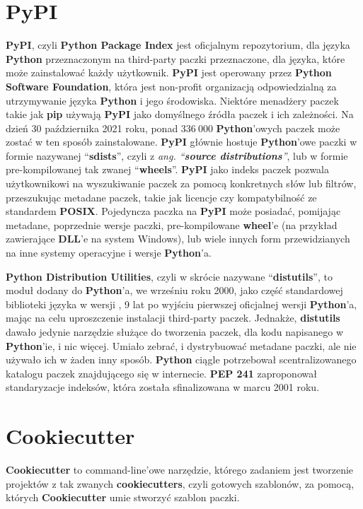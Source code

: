 \section{PyPI}

\textbf{PyPI}, \cite{PyPI} \cite{AdvancedPythonDevelopment} czyli \textbf{Python Package Index} jest oficjalnym repozytorium, dla języka \textbf{Python} przeznaczonym na third-party paczki przeznaczone, dla języka, które może zainstalować każdy użytkownik. \textbf{PyPI} jest operowany przez \textbf{Python Software Foundation}, która jest non-profit organizacją odpowiedzialną za utrzymywanie języka \textbf{Python} i jego  środowiska. Niektóre menadżery paczek takie jak \textbf{pip} \cite{Pip} używają \textbf{PyPI} jako domyślnego źródła paczek i ich zależności. Na dzień 30 października 2021 roku, ponad $336 \ 000$ \textbf{Python}'owych paczek może zostać w ten sposób zainstalowane. \textbf{PyPI} głównie hostuje \textbf{Python}'owe paczki w formie nazywanej ``\textbf{sdists}'', czyli z \textit{ang. ``\textbf{source distributions}''}, lub w formie pre-kompilowanej tak zwanej ``\textbf{wheels}''. \textbf{PyPI} jako indeks paczek pozwala użytkownikowi na wyszukiwanie paczek za pomocą konkretnych słów lub filtrów, przeszukując metadane paczek, takie jak licencje czy kompatybilność ze standardem \textbf{POSIX}. Pojedyncza paczka na \textbf{PyPI} może posiadać, pomijając metadane, poprzednie wersje paczki, pre-kompilowane \textbf{wheel}'e (na przykład zawierające \textbf{DLL}'e na system Windows), lub wiele innych form przewidzianych na inne systemy operacyjne i wersje \textbf{Python}'a.

\textbf{Python Distribution Utilities}, czyli w skrócie nazywane ``\textbf{distutils}'', to moduł dodany do \textbf{Python}'a, we wrześniu roku 2000, jako część standardowej biblioteki języka w wersji , 9 lat po wyjściu pierwszej oficjalnej wersji \textbf{Python}'a, mając na celu uproszczenie instalacji third-party paczek.
Jednakże, \textbf{distutils} dawało jedynie narzędzie służące do tworzenia paczek, dla kodu napisanego w \textbf{Python}'ie, i nic więcej. Umiało zebrać, i dystrybuować metadane paczki, ale nie używało ich w żaden inny sposób. \textbf{Python} ciągle potrzebował scentralizowanego katalogu paczek znajdującego się w internecie. \textbf{PEP 241} \cite{PEP241} zaproponował standaryzacje indeksów, która została sfinalizowana w marcu 2001 roku.


\clearpage

\section{Cookiecutter}
\textbf{Cookiecutter} \cite{CookieCutterDocumentation} \cite{CookiecutterGitHub} to command-line'owe narzędzie, którego zadaniem jest tworzenie projektów z tak zwanych \textbf{cookiecutters}, czyli gotowych szablonów, za pomocą, których \textbf{Cookiecutter} umie stworzyć szablon paczki.

